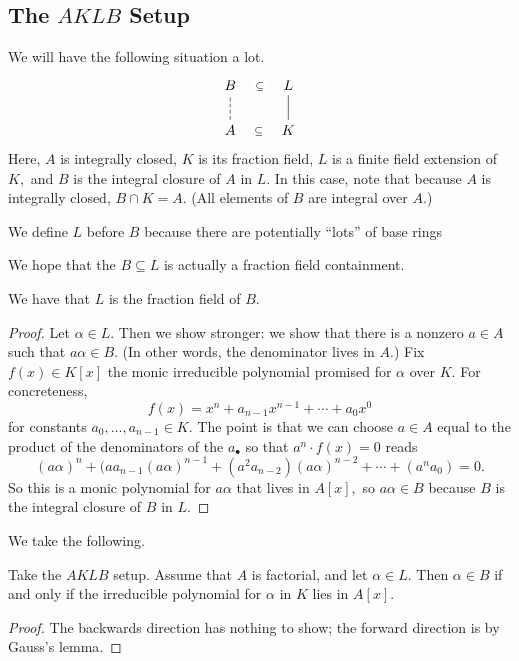 \subsection{The \texorpdfstring{$AKLB$}{} Setup}
We will have the following situation a lot.
\[\begin{tikzcd}
	B & L \\
	A & K
	\arrow[no head, from=2-2, to=1-2]
	\arrow["\subseteq"{description}, draw=none, from=2-1, to=2-2]
	\arrow["\subseteq"{description}, draw=none, from=1-1, to=1-2]
	\arrow[dashed, no head, from=2-1, to=1-1]
\end{tikzcd}\]
Here, $A$ is integrally closed, $K$ is its fraction field, $L$ is a finite field extension of $K,$ and $B$ is the integral closure of $A$ in $L.$ In this case, note that because $A$ is integrally closed, $B\cap K=A.$ (All elements of $B$ are integral over $A.$)
\begin{remark}
    We define $L$ before $B$ because there are potentially ``lots'' of base rings 
\end{remark}

We hope that the $B\subseteq L$ is actually a fraction field containment.
\begin{prop}
    We have that $L$ is the fraction field of $B.$
\end{prop}
\begin{proof}
    Let $\alpha\in L.$ Then we show stronger: we show that there is a nonzero $a\in A$ such that $a\alpha\in B.$ (In other words, the denominator lives in $A.$) Fix $f(x)\in K[x]$ the monic irreducible polynomial promised for $\alpha$ over $K.$ For concreteness,
    \[f(x)=x^n+a_{n-1}x^{n-1}+\cdots+a_0x^0\]
    for constants $a_0,\ldots,a_{n-1}\in K.$ The point is that we can choose $a\in A$ equal to the product of the denominators of the $a_\bullet$ so that $a^n\cdot f(x)=0$ reads
    \[(a\alpha)^n+(aa_{n-1}(a\alpha)^{n-1}+(a^2a_{n-2})(a\alpha)^{n-2}+\cdots+(a^na_0)=0.\]
    So this is a monic polynomial for $a\alpha$ that lives in $A[x],$ so $a\alpha\in B$ because $B$ is the integral closure of $B$ in $L.$
\end{proof}
We take the following.
\begin{prop}
    Take the $AKLB$ setup. Assume that $A$ is factorial, and let $\alpha\in L.$ Then $\alpha\in B$ if and only if the irreducible polynomial for $\alpha$ in $K$ lies in $A[x].$
\end{prop}
\begin{proof}
    The backwards direction has nothing to show; the forward direction is by Gauss's lemma.\todo{}
\end{proof}

